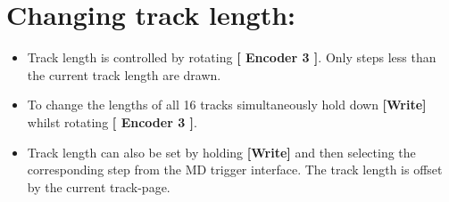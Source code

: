 \vspace{-0.3cm}

\section{Changing track length:}
\begin{itemize}
\item Track length is controlled by rotating \textbf{[ Encoder 3 ]}. Only steps less than the current track length are drawn.
\item To change the lengths of all 16 tracks simultaneously hold down \textbf{[Write]} whilst rotating \textbf{[ Encoder 3 ]}.
\item Track length can also be set by holding \textbf{[Write]} and then selecting the corresponding step from the MD trigger interface. The track length is offset by the current track-page.
\end{itemize}
